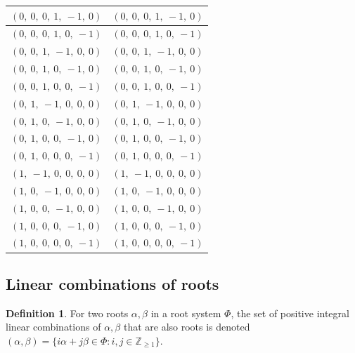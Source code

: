 \documentclass[11pt]{article}
\theoremstyle{definition}
\newtheorem{definition}{Definition}[section]
\newif\ifsummablepairs
\begin{document}
\begin{tabular}{|l|l|}
    \hline
    $\left( 0, \  0, \  0, \  1, \  -1, \  0\right)$ & $\left( 0, \  0, \  0, \  1, \  -1, \  0\right)$ \\
    \hline
    $\left( 0, \  0, \  0, \  1, \  0, \  -1\right)$ & $\left( 0, \  0, \  0, \  1, \  0, \  -1\right)$ \\
    \hline
    $\left( 0, \  0, \  1, \  -1, \  0, \  0\right)$ & $\left( 0, \  0, \  1, \  -1, \  0, \  0\right)$ \\
    \hline
    $\left( 0, \  0, \  1, \  0, \  -1, \  0\right)$ & $\left( 0, \  0, \  1, \  0, \  -1, \  0\right)$ \\
    \hline
    $\left( 0, \  0, \  1, \  0, \  0, \  -1\right)$ & $\left( 0, \  0, \  1, \  0, \  0, \  -1\right)$ \\
    \hline
    $\left( 0, \  1, \  -1, \  0, \  0, \  0\right)$ & $\left( 0, \  1, \  -1, \  0, \  0, \  0\right)$ \\
    \hline
    $\left( 0, \  1, \  0, \  -1, \  0, \  0\right)$ & $\left( 0, \  1, \  0, \  -1, \  0, \  0\right)$ \\
    \hline
    $\left( 0, \  1, \  0, \  0, \  -1, \  0\right)$ & $\left( 0, \  1, \  0, \  0, \  -1, \  0\right)$ \\
    \hline
    $\left( 0, \  1, \  0, \  0, \  0, \  -1\right)$ & $\left( 0, \  1, \  0, \  0, \  0, \  -1\right)$ \\
    \hline
    $\left( 1, \  -1, \  0, \  0, \  0, \  0\right)$ & $\left( 1, \  -1, \  0, \  0, \  0, \  0\right)$ \\
    \hline
    $\left( 1, \  0, \  -1, \  0, \  0, \  0\right)$ & $\left( 1, \  0, \  -1, \  0, \  0, \  0\right)$ \\
    \hline
    $\left( 1, \  0, \  0, \  -1, \  0, \  0\right)$ & $\left( 1, \  0, \  0, \  -1, \  0, \  0\right)$ \\
    \hline
    $\left( 1, \  0, \  0, \  0, \  -1, \  0\right)$ & $\left( 1, \  0, \  0, \  0, \  -1, \  0\right)$ \\
    \hline
    $\left( 1, \  0, \  0, \  0, \  0, \  -1\right)$ & $\left( 1, \  0, \  0, \  0, \  0, \  -1\right)$ \\
    \hline
\end{tabular}


\ifsummablepairs
\subsection{Linear combinations of roots}

\begin{definition}
For two roots $\alpha, \beta$ in a root system $\Phi$, the set of positive integral linear combinations of $\alpha, \beta$ that are also roots is denoted
\(
	(\alpha, \beta) = \{ i \alpha + j \beta \in \Phi : i, j \in \mathbb{Z}_{\ge 1} \}
\).
\end{definition}
\end{document}
